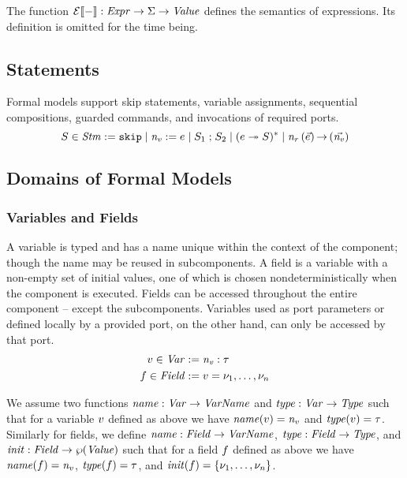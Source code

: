 \documentclass[a4paper,10pt,english]{article}
\begin{document}
The function $\mathcal{E} \llbracket - \rrbracket : \mathit{Expr} \rightarrow \Sigma \rightarrow \mathit{Value}$ defines the semantics of
expressions.
Its definition is omitted for the time being.

\subsection{Statements}

Formal models support skip statements, variable assignments, sequential compositions, guarded commands, and
invocations of required ports.
\begin{equation*}
	S \in \mathit{Stm} :=
		\mathtt{skip} \mid 
		\mathit{n_v}\; \mathtt{:=}\; e \mid
		S_1 \; \mathtt{;} \; S_2 \mid
		(e \; \mathtt{\twoheadrightarrow} \; S)^* \mid
		\mathit{n_r} \left( \vec{e} \right) \mathtt{\rightarrow} \left( \vec{\mathit{n_v}} \right)
\end{equation*}

\subsection{Domains of Formal Models}

\subsubsection{Variables and Fields}
A variable is typed and has a name unique within the context of the component; though the name may be reused in subcomponents.
A field is a variable with a non-empty set of initial values, one of which is chosen nondeterministically when
the component is executed. Fields can be accessed throughout the entire component -- except the subcomponents. Variables used as
port parameters or defined locally by a provided port, on the other hand, can only be accessed by that port. 
\begin{align*}
	v \in \mathit{Var} &:= \mathit{n_v} \; \mathtt{:} \; \tau \\
	f \in \mathit{Field} &:= v \; \mathtt{=} \; \nu_1, \ldots, \nu_n
\end{align*}

We assume two functions $\mathit{name} : \mathit{Var} \rightarrow \mathit{VarName}$ and $\mathit{type} : \mathit{Var} \rightarrow \mathit{Type}$ such that for a variable
$v$ defined as above we have $\mathit{name}(v) = \mathit{n_v}$ and $\mathit{type}(v) = \tau$. Similarly for
fields, we define $\mathit{name} : \mathit{Field} \rightarrow \mathit{VarName}$, $\mathit{type} : \mathit{Field} \rightarrow \mathit{Type}$, and $\mathit{init} : \mathit{Field} \rightarrow
\wp (\mathit{Value})$ such that for a field $f$ defined as above we have $\mathit{name}(f) =
\mathit{n_v}$, $\mathit{type}(f) = \tau$, and $\mathit{init}(f) = \{\nu_1, \ldots, \nu_n\}$.
\end{document}
